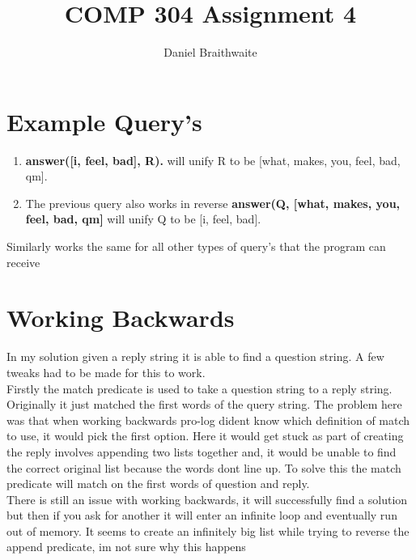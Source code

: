\documentclass[a4paper, 12pt]{article}
\title{COMP 304 Assignment 4}
\author{Daniel Braithwaite}
\begin{document}
	\maketitle
	\newpage
  	
	\section{Example Query's}  	
		\begin{enumerate}
			\item \textbf{answer([i, feel, bad], R).} will unify R to be [what, makes, you, feel, bad, qm].
			
			\item The previous query also works in reverse \textbf{answer(Q, [what, makes, you, feel, bad, qm]} will unify Q to be [i, feel, bad].		
		\end{enumerate}		  	
  	
		Similarly works the same for all other types of query's that the program can receive  	
  	
  	\section{Working Backwards}
		In my solution given a reply string it is able to find a question string. A few tweaks had to be made for this to work.\\
		
		Firstly the match predicate is used to take a question string to a reply string. Originally it just matched the first words of the query string. The problem here was that when working backwards pro-log dident know which definition of match to use, it would pick the first option. Here it would get stuck as part of creating the reply involves appending two lists together and, it would be unable to find the correct original list because the words dont line up. To solve this the match predicate will match on the first words of question and reply.\\ 
  	
  	There is still an issue with working backwards, it will successfully find a solution but then if you ask for another it will enter an infinite loop and eventually run out of memory. It seems to create an infinitely big list while trying to reverse the append predicate, im not sure why this happens
\end{document}
